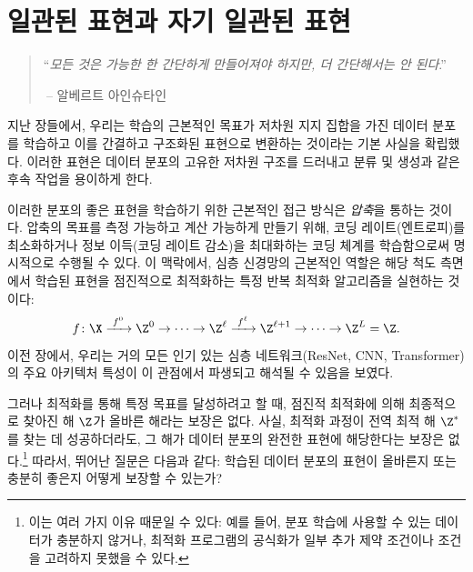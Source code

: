 \documentclass[../../book-main_ko.tex]{subfiles}
\begin{document}
\chapter{일관된 표현과 자기 일관된 표현}
\label{ch:consistent}\label{ch:autoencoding}\label{ch:self-consistent}\label{ch:closed-loop}

\begin{quote}
\hfill  ``{\em 모든 것은 가능한 한 간단하게 만들어져야 하지만, 더 간단해서는 안 된다}.''

$~$\hfill -- 알베르트 아인슈타인
\end{quote}



\vspace{5mm}


지난 장들에서, 우리는 학습의 근본적인 목표가 저차원 지지 집합을 가진 데이터 분포를 학습하고 이를 간결하고 구조화된 표현으로 변환하는 것이라는 기본 사실을 확립했다. 이러한 표현은 데이터 분포의 고유한 저차원 구조를 드러내고 분류 및 생성과 같은 후속 작업을 용이하게 한다.

이러한 분포의 좋은 표현을 학습하기 위한 근본적인 접근 방식은 {\em 압축}을 통하는 것이다. 압축의 목표를 측정 가능하고 계산 가능하게 만들기 위해, 코딩 레이트(엔트로피)를 최소화하거나 정보 이득(코딩 레이트 감소)을 최대화하는 코딩 체계를 학습함으로써 명시적으로 수행될 수 있다. 이 맥락에서, 심층 신경망의 근본적인 역할은 해당 척도 측면에서 학습된 표현을 점진적으로 최적화하는 특정 반복 최적화 알고리즘을 실현하는 것이다:
\begin{equation}
  f\colon \X
  \xrightarrow{\hspace{1mm} f^0 \hspace{1mm}} \Z^0 \rightarrow \cdots
  \rightarrow \Z^\ell \xrightarrow{\hspace{1mm} f^\ell \hspace{1mm}}
  \Z^{\ell+1} \rightarrow  \cdots \to \Z^L = \Z.
\end{equation}
이전 장에서, 우리는 거의 모든 인기 있는 심층 네트워크(ResNet, CNN, Transformer)의 주요 아키텍처 특성이 이 관점에서 파생되고 해석될 수 있음을 보였다.

그러나 최적화를 통해 특정 목표를 달성하려고 할 때, 점진적 최적화에 의해 최종적으로 찾아진 해 $\Z$가 올바른 해라는 보장은 없다. 사실, 최적화 과정이 전역 최적 해 $\Z^*$를 찾는 데 성공하더라도, 그 해가 데이터 분포의 완전한 표현에 해당한다는 보장은 없다.\footnote{이는 여러 가지 이유 때문일 수 있다: 예를 들어, 분포 학습에 사용할 수 있는 데이터가 충분하지 않거나, 최적화 프로그램의 공식화가 일부 추가 제약 조건이나 조건을 고려하지 못했을 수 있다.} 따라서, 뛰어난 질문은 다음과 같다: 학습된 데이터 분포의 표현이 올바른지 또는 충분히 좋은지 어떻게 보장할 수 있는가?
\end{document}
